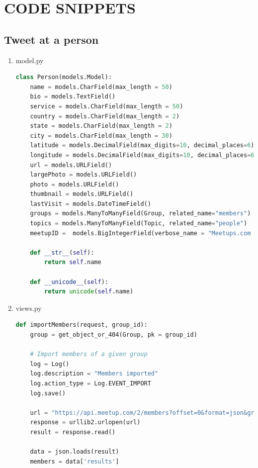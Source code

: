 \documentclass[letterpaper,10pt,onecolumn]{IEEEtran} %
\begin{document}
\section{CODE SNIPPETS}

\subsection{Tweet at a person}
\begin{enumerate}
\item model.py
\begin{center}
\begin{lstlisting}[language=Python]
class Person(models.Model):
    name = models.CharField(max_length = 50)
    bio = models.TextField()
    service = models.CharField(max_length = 50)
    country = models.CharField(max_length = 2)
    state = models.CharField(max_length = 2)
    city = models.CharField(max_length = 30)
    latitude = models.DecimalField(max_digits=10, decimal_places=6)
    longitude = models.DecimalField(max_digits=10, decimal_places=6)
    url = models.URLField()
    largePhoto = models.URLField()
    photo = models.URLField()
    thumbnail = models.URLField()
    lastVisit = models.DateTimeField()
    groups = models.ManyToManyField(Group, related_name="members")
    topics = models.ManyToManyField(Topic, related_name="people")
    meetupID =  models.BigIntegerField(verbose_name = "Meetups.com ID", unique=True)

    def __str__(self):
        return self.name

    def __unicode__(self):
        return unicode(self.name)
\end{lstlisting}
\end{center}

\item views.py
\begin{center}
\begin{lstlisting}[language=Python]
def importMembers(request, group_id):
    group = get_object_or_404(Group, pk = group_id)

    # Import members of a given group
    log = Log()
    log.description = "Members imported"
    log.action_type = Log.EVENT_IMPORT
    log.save()

    url = "https://api.meetup.com/2/members?offset=0&format=json&group_id=" + str(group.meetupID) + "&photo-host=public&page=500&sig_id=148657742&key=" + MEETUP_API_KEY
    response = urllib2.urlopen(url)
    result = response.read()

    data = json.loads(result)
    members = data['results']


\end{lstlisting}
\end{center}
\end{enumerate}
\end{document}
